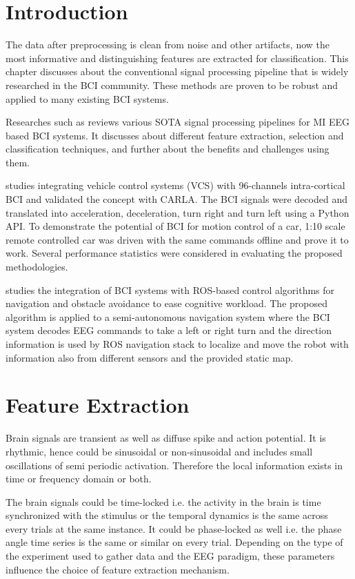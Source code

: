\section*{Introduction}
The data after preprocessing is clean from noise and other artifacts, now the most informative and distinguishing features are extracted for classification. This chapter discusses about the conventional signal processing pipeline that is widely researched in the BCI community. These methods are proven to be robust and applied to many existing BCI systems.

Researches such as \cite{2019_BMI_MIEEG} reviews various SOTA  signal processing pipelines for MI EEG based BCI systems. It discusses about different feature extraction, selection and classification techniques, and further about the benefits and challenges using them. 

\cite{2019_BMI_CARLA} studies integrating vehicle control systems (VCS) with 96-channels intra-cortical BCI and validated the concept with CARLA. The BCI signals were decoded and translated into acceleration, deceleration, turn right and turn left using a Python API. To demonstrate the potential of BCI for motion control of a car, 1:10 scale remote controlled car was driven with the same commands offline and prove it to work. Several performance statistics were considered in evaluating the proposed methodologies.

\cite{2019_BCI_ROS} studies the integration of BCI systems with ROS-based control algorithms for navigation and obstacle avoidance to ease cognitive workload. The proposed algorithm is applied to a semi-autonomous navigation system where the BCI system decodes EEG commands to take a left or right turn and the direction information is used by ROS navigation stack to localize and move the robot with information also from different sensors and the provided static map.

\section{Feature Extraction} \label{feat_ext}
Brain signals are transient as well as diffuse spike and action potential. It is rhythmic, hence could be sinusoidal or non-sinusoidal and includes small oscillations of semi periodic activation. Therefore the local information exists in time or frequency domain or both. \par

The brain signals could be time-locked i.e. the activity in the brain is time synchronized with the stimulus or the temporal dynamics is the same across every trials at the same instance. It could be phase-locked as well i.e. the phase angle time series is the same or similar on every trial. Depending on the type of the experiment used to gather data and the EEG paradigm, these parameters influence the choice of feature extraction mechanism. 


